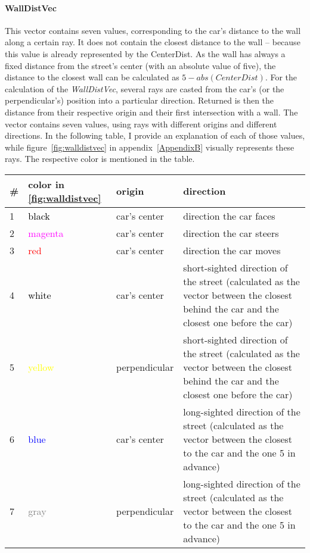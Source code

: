 \paragraph{WallDistVec} This vector contains seven values, corresponding to the car's distance to the wall along a certain ray. It does not contain the closest distance to the wall -- because this value is already represented by the CenterDist. As the wall has always a fixed distance from the street's center (with an absolute value of five), the distance to the closest wall can be calculated as $5 - abs(CenterDist)$. 
For the calculation of the \emph{WallDistVec}, several rays are casted from the car's (or the perpendicular's) position into a particular direction. Returned is then the distance from their respective origin and their first intersection with a wall. The vector contains seven values, using rays with different origins and different directions. In the following table, I provide an explanation of each of those values, while figure~\ref{fig:walldistvec} in appendix~\ref{AppendixB} visually represents these rays. The respective color is mentioned in the table.
\renewcommand{\arraystretch}{1.3}
\begin{flushleft}
	\begin{tabular}{p{0.5cm} p{2cm} p{2.4cm} p{\textwidth-6.45cm}} 
		\# & color in \ref{fig:walldistvec} & origin & direction \\
		\hline
		1 & \textcolor{black}{black} & car's center & direction the car faces \\
		2 & \textcolor{magenta}{magenta} & car's center & direction the car steers\\	
		3 & \textcolor{red}{red} & car's center & direction the car moves\\	
		4 & \textcolor{black}{white} & car's center & short-sighted direction of the street (calculated as the vector between the closest \codeobj{anchorVector} behind the car and the closest one before the car) \\		
		5 & \textcolor{yellow}{yellow} & perpendicular & short-sighted direction of the street (calculated as the vector between the closest \codeobj{anchorVector} behind the car and the closest one before the car) \\
		6 & \textcolor{blue}{blue} & car's center & long-sighted direction of the street (calculated as the vector between the closest \codeobj{anchorVector}  to the car and the one 5 in advance) \\
		7 & \textcolor{gray}{gray} & perpendicular & long-sighted direction of the street (calculated as the vector between the closest \codeobj{anchorVector}  to the car and the one 5 in advance) \\
	\end{tabular}
\end{flushleft}

